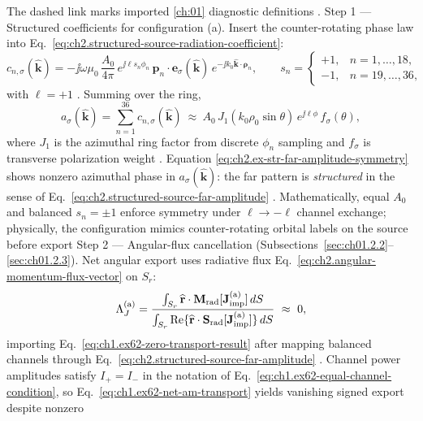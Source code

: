 The dashed
link marks imported \ref{ch:01} diagnostic definitions . Step 1 — Structured coefficients for configuration (a). Insert the counter-rotating phase law into Eq.~\eqref{eq:ch2.structured-source-radiation-coefficient}:
\begin{equation}
\label{eq:ch2.ex-str-counterprop-coefficient}
c_{n,\sigma}(\widehat{\mathbf{k}})
=
-\jj\omega\mu_0\,\frac{A_0}{4\pi}\,
e^{\jj \ell s_n \phi_n}\,
\mathbf{p}_n\cdot\mathbf{e}_\sigma(\widehat{\mathbf{k}})\,
e^{-\jj k_0\widehat{\mathbf{k}}\cdot\boldsymbol{\rho}_n},
\qquad
s_n=
\begin{cases}
+1, & n=1,\ldots,18,\\
-1, & n=19,\ldots,36,
\end{cases}
\end{equation}
with \(\ell=+1\) . Summing over the ring,
\begin{equation}
\label{eq:ch2.ex-str-far-amplitude-symmetry}
a_\sigma(\widehat{\mathbf{k}})
=
\sum_{n=1}^{36} c_{n,\sigma}(\widehat{\mathbf{k}})
\ \approx\
A_0\,J_1(k_0\rho_0\sin\theta)\,e^{\jj\ell\phi}\,f_\sigma(\theta),
\end{equation}
where \(J_1\) is the azimuthal ring factor from discrete \(\phi_n\) sampling and
\(f_\sigma\) is transverse polarization weight . Equation
\eqref{eq:ch2.ex-str-far-amplitude-symmetry} shows nonzero azimuthal phase in
\(a_\sigma(\widehat{\mathbf{k}})\): the far pattern is \emph{structured} in the sense of
Eq.~\eqref{eq:ch2.structured-source-far-amplitude} . Mathematically, equal
\(A_0\) and balanced \(s_n=\pm 1\) enforce symmetry under \(\ell\to-\ell\) channel exchange;
physically, the configuration mimics counter-rotating orbital labels on the source before export
Step 2 --- Angular-flux cancellation (Subsections~\ref{sec:ch01.2.2}--\ref{sec:ch01.2.3}). Net angular export uses radiative flux Eq.~\eqref{eq:ch2.angular-momentum-flux-vector} on
\(S_r\):
\begin{equation}
\label{eq:ch2.ex-str-transport-quotient-a}
\Lambda_J^{(\mathrm{a})}
=
\frac{\int_{S_r}\widehat{\mathbf{r}}\cdot\mathbf{M}_{\mathrm{rad}}[\mathbf{J}_{\mathrm{imp}}^{(\mathrm{a})}]\,dS}
 {\int_{S_r}\Re\{\widehat{\mathbf{r}}\cdot\mathbf{S}_{\mathrm{rad}}[\mathbf{J}_{\mathrm{imp}}^{(\mathrm{a})}]\}\,dS}
\ \approx\ 0,
\end{equation}
importing Eq.~\eqref{eq:ch1.ex62-zero-transport-result} after mapping balanced channels through
Eq.~\eqref{eq:ch2.structured-source-far-amplitude} \cite{stratton1941}. Channel
power amplitudes satisfy \(I_+=I_-\) in the notation of
Eq.~\eqref{eq:ch1.ex62-equal-channel-condition}, so
Eq.~\eqref{eq:ch1.ex62-net-am-transport} yields vanishing signed export despite nonzero
